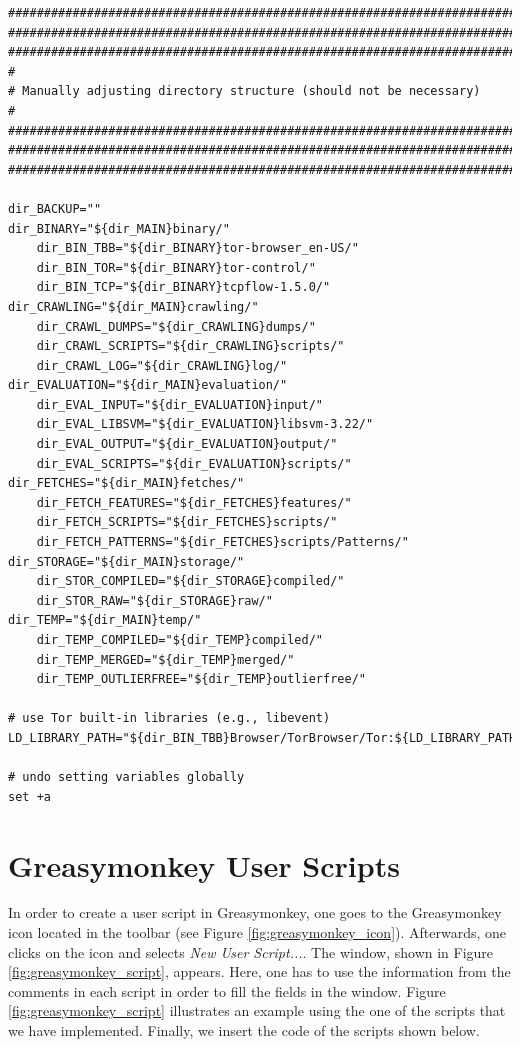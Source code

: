 \begin{verbatim}
#######################################################################
#######################################################################
#######################################################################
#
# Manually adjusting directory structure (should not be necessary)
#
#######################################################################
#######################################################################
#######################################################################

dir_BACKUP=""
dir_BINARY="${dir_MAIN}binary/"
	dir_BIN_TBB="${dir_BINARY}tor-browser_en-US/"
	dir_BIN_TOR="${dir_BINARY}tor-control/"
	dir_BIN_TCP="${dir_BINARY}tcpflow-1.5.0/"
dir_CRAWLING="${dir_MAIN}crawling/"
	dir_CRAWL_DUMPS="${dir_CRAWLING}dumps/"
	dir_CRAWL_SCRIPTS="${dir_CRAWLING}scripts/"
	dir_CRAWL_LOG="${dir_CRAWLING}log/"
dir_EVALUATION="${dir_MAIN}evaluation/"
	dir_EVAL_INPUT="${dir_EVALUATION}input/"
	dir_EVAL_LIBSVM="${dir_EVALUATION}libsvm-3.22/"
	dir_EVAL_OUTPUT="${dir_EVALUATION}output/"
	dir_EVAL_SCRIPTS="${dir_EVALUATION}scripts/"
dir_FETCHES="${dir_MAIN}fetches/"
	dir_FETCH_FEATURES="${dir_FETCHES}features/"
	dir_FETCH_SCRIPTS="${dir_FETCHES}scripts/"
	dir_FETCH_PATTERNS="${dir_FETCHES}scripts/Patterns/"
dir_STORAGE="${dir_MAIN}storage/"
	dir_STOR_COMPILED="${dir_STORAGE}compiled/"
	dir_STOR_RAW="${dir_STORAGE}raw/"
dir_TEMP="${dir_MAIN}temp/"
    dir_TEMP_COMPILED="${dir_TEMP}compiled/"
	dir_TEMP_MERGED="${dir_TEMP}merged/"
	dir_TEMP_OUTLIERFREE="${dir_TEMP}outlierfree/"
	
# use Tor built-in libraries (e.g., libevent)
LD_LIBRARY_PATH="${dir_BIN_TBB}Browser/TorBrowser/Tor:${LD_LIBRARY_PATH}"

# undo setting variables globally
set +a

\end{verbatim}

\newpage
\section{Greasymonkey User Scripts}
\label{sec:greasymonkey_scripts}

In order to create a user script in Greasymonkey, one goes to the Greasymonkey icon located in the toolbar (see Figure \ref{fig:greasymonkey_icon}). Afterwards, one clicks on the icon and selects \emph{New User Script...}. The window, shown in Figure \ref{fig:greasymonkey_script}, appears. Here, one has to use the information from the comments in each script in order to fill the fields in the window. Figure \ref{fig:greasymonkey_script} illustrates an example using the one of the scripts that we have implemented. Finally, we insert the code of the scripts shown below.

